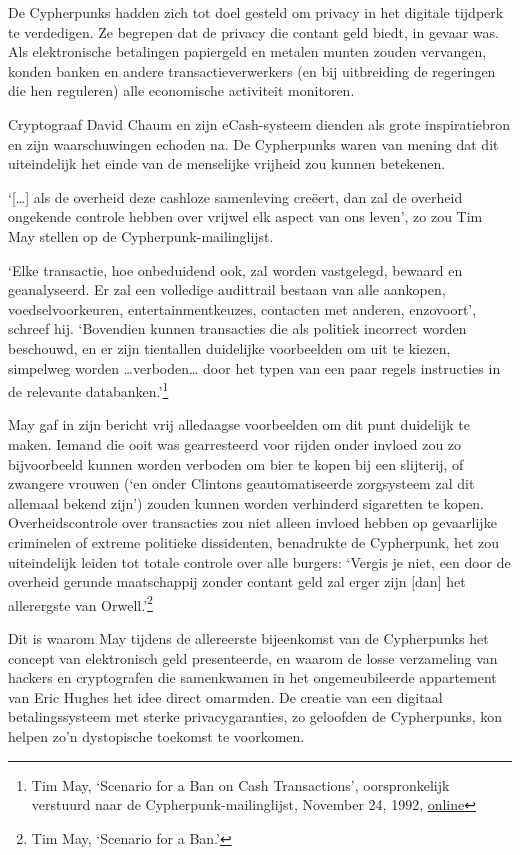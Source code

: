 \documentclass[
  a5paper,
  smalldemyvopaper,11pt,twoside,onecolumn,openright,extrafontsizes,
hidelinks]{memoir}
\begin{document}
De Cypherpunks hadden zich tot doel gesteld om privacy in het digitale
tijdperk te verdedigen. Ze begrepen dat de privacy die contant geld
biedt, in gevaar was. Als elektronische betalingen papiergeld en metalen
munten zouden vervangen, konden banken en andere transactieverwerkers
(en bij uitbreiding de regeringen die hen reguleren) alle economische
activiteit monitoren.

Cryptograaf David Chaum en zijn eCash-systeem dienden als grote
inspiratiebron en zijn waarschuwingen echoden na. De Cypherpunks waren
van mening dat dit uiteindelijk het einde van de menselijke vrijheid zou
kunnen betekenen.

`{[}\ldots{]} als de overheid deze cashloze samenleving creëert, dan zal
de overheid ongekende controle hebben over vrijwel elk aspect van ons
leven', zo zou Tim May stellen op de Cypherpunk-mailinglijst.

`Elke transactie, hoe onbeduidend ook, zal worden vastgelegd, bewaard en
geanalyseerd. Er zal een volledige audittrail bestaan van alle aankopen,
voedselvoorkeuren, entertainmentkeuzes, contacten met anderen,
enzovoort', schreef hij. `Bovendien kunnen transacties die als politiek
incorrect worden beschouwd, en er zijn tientallen duidelijke voorbeelden
om uit te kiezen, simpelweg worden \ldots verboden\ldots{} door het
typen van een paar regels instructies in de relevante
databanken.'\footnote{Tim May, `Scenario for a Ban on Cash
  Transactions', oorspronkelijk verstuurd naar de
  Cypherpunk-mailinglijst, November 24, 1992,
  \href{https://cypherpunks.venona.com/date/1992/11/msg00211.html}{online}}

May gaf in zijn bericht vrij alledaagse voorbeelden om dit punt
duidelijk te maken. Iemand die ooit was gearresteerd voor rijden onder
invloed zou zo bijvoorbeeld kunnen worden verboden om bier te kopen bij
een slijterij, of zwangere vrouwen (`en onder Clintons geautomatiseerde
zorgsysteem zal dit allemaal bekend zijn') zouden kunnen worden
verhinderd sigaretten te kopen. Overheidscontrole over transacties zou
niet alleen invloed hebben op gevaarlijke criminelen of extreme
politieke dissidenten, benadrukte de Cypherpunk, het zou uiteindelijk
leiden tot totale controle over alle burgers: `Vergis je niet, een door
de overheid gerunde maatschappij zonder contant geld zal erger zijn
{[}dan{]} het allerergste van Orwell.'\footnote{Tim May, `Scenario for a
  Ban.'}

Dit is waarom May tijdens de allereerste bijeenkomst van de Cypherpunks
het concept van elektronisch geld presenteerde, en waarom de losse
verzameling van hackers en cryptografen die samenkwamen in het
ongemeubileerde appartement van Eric Hughes het idee direct omarmden. De
creatie van een digitaal betalingssysteem met sterke privacygaranties,
zo geloofden de Cypherpunks, kon helpen zo'n dystopische toekomst te
voorkomen.
\end{document}
